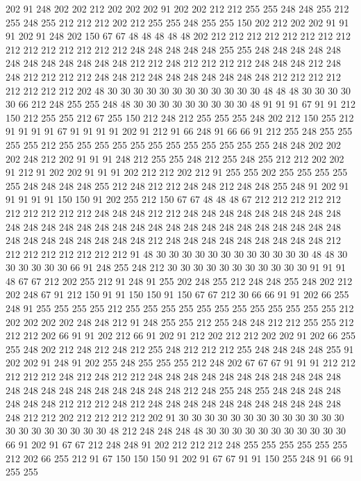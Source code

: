 202 91 248 202 202 212 202 202 202 91 202 202 212 212 255 255 248 248 255 212
255 248 255 212 212 212 202 212 255 255 248 255 255 150 202 212 202 202 91 91
91 202 91 248 202 150 67 67 48 48 48 48 48 202 212 212 212 212 212 212
212 212 212 212 212 212 212 212 212 248 248 248 248 248 255 255 248 248 248 248
248 248 248 248 248 248 248 248 212 212 248 212 212 212 212 248 248 248 212 248
248 212 212 212 212 248 248 212 248 248 248 248 248 248 248 212 212 212 212 212
212 212 212 202 48 30 30 30 30 30 30 30 30 30 30 30 30 48 48 48
30 30 30 30 30 66 212 248 255 255 248 48 30 30 30 30 30 30 30 30
30 48 91 91 91 67 91 91 212 150 212 255 255 212 67 255 150 212 248 212
255 255 255 248 202 212 150 255 212 91 91 91 91 67 91 91 91 91 202 91
212 91 66 248 91 66 66 91 212 255 248 255 255 255 255 212 255 255 255 255
255 255 255 255 255 255 255 255 248 248 202 202 202 248 212 202 91 91 91 248
212 255 255 248 212 255 248 255 212 212 202 202 91 212 91 202 202 91 91 91
202 212 212 202 212 91 255 255 202 255 255 255 255 255 248 248 248 248 255 212
248 212 212 248 248 212 248 248 255 248 91 202 91 91 91 91 91 150 150 91
202 255 212 150 67 67 48 48 48 67 212 212 212 212 212 212 212 212 212 212
248 248 248 212 212 248 248 248 248 248 248 248 248 248 248 248 248 248 248 248
248 248 248 248 248 248 248 248 248 248 248 248 248 248 248 248 248 248 248 248
248 212 248 248 248 248 248 248 248 248 248 212 212 212 212 212 212 212 212 91
48 30 30 30 30 30 30 30 30 30 30 30 30 48 48 30 30 30 30 30
30 66 91 248 255 248 212 30 30 30 30 30 30 30 30 30 30 30 91 91
91 48 67 67 212 202 255 212 91 248 91 255 202 248 255 212 248 248 255 248
202 212 202 248 67 91 212 150 91 91 150 150 91 150 67 67 212 30 66 66
91 91 202 66 255 248 91 255 255 255 255 212 255 255 255 255 255 255 255 255
255 255 255 255 212 202 202 202 202 248 248 212 91 248 255 255 212 255 248 248
212 212 255 255 212 212 212 202 66 91 91 202 212 66 91 202 91 212 202 212
212 202 202 91 202 66 255 255 248 202 212 248 212 248 212 255 248 212 212 212
255 248 248 248 248 255 91 202 202 91 248 91 202 255 248 255 255 255 212 248
202 67 67 67 91 91 91 212 212 212 212 212 248 212 248 212 212 248 248 248
248 248 248 248 248 248 248 248 248 248 248 248 248 248 248 248 248 248 212 248
255 248 255 248 248 248 248 248 248 248 212 212 212 248 212 248 248 248 248 248
248 248 248 248 248 248 248 212 212 202 212 212 212 212 202 91 30 30 30 30
30 30 30 30 30 30 30 30 30 30 30 30 30 30 30 30 30 48 212 248
248 248 48 30 30 30 30 30 30 30 30 30 30 30 66 91 202 91 67 67
212 248 248 91 202 212 212 212 248 255 255 255 255 255 255 212 202 66 255 212
91 67 150 150 150 91 202 91 67 67 91 91 150 255 248 91 66 91 255 255
